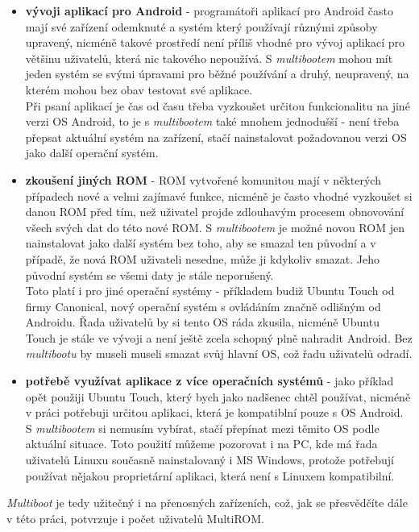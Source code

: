\documentclass[12pt, a4paper, oneside]{article}
\newcommand{\B}{\textbf} %
\newcommand{\It}{\textit}  %
\begin{document}
\begin{itemize}
    \item \B{vývoji aplikací pro Android} - programátoři aplikací pro Android často mají své zařízení odemknuté a systém který používají různými způsoby upravený, nicméně takové prostředí není příliš vhodné pro vývoj aplikací pro většinu uživatelů, která nic takového nepoužívá. S \It{multibootem} mohou mít jeden systém se svými úpravami pro běžné používání a druhý, neupravený, na kterém mohou bez obav testovat své aplikace. \\
    Při psaní aplikací je čas od času třeba vyzkoušet určitou funkcionalitu na jiné verzi OS Android, to je s \It{multibootem} také mnohem jednodušší - není třeba přepsat aktuální systém na zařízení, stačí nainstalovat požadovanou verzi OS jako další operační systém.

    \item \B{zkoušení jiných ROM} - ROM vytvořené komunitou mají v některých případech nové a velmi zajímavé funkce, nicméně je často vhodné vyzkoušet si danou ROM před tím, než uživatel projde zdlouhavým procesem obnovování všech svých dat do této nové ROM. S \It{multibootem} je možné novou ROM jen nainstalovat jako další systém bez toho, aby se smazal ten původní a v případě, že nová ROM uživateli nesedne, může ji kdykoliv smazat. Jeho původní systém se všemi daty je stále neporušený.\\
    Toto platí i pro jiné operační systémy - příkladem budiž Ubuntu Touch od firmy Canonical, nový operační systém s ovládáním značně odlišným od Androidu. Řada uživatelů by si tento OS ráda zkusila, nicméně Ubuntu Touch je stále ve vývoji a není ještě zcela schopný plně nahradit Android. Bez \It{multibootu} by museli museli smazat svůj hlavní OS, což řadu uživatelů odradí.

    \item \B{potřebě využívat aplikace z více operačních systémů} - jako příklad opět použiji Ubuntu Touch, který bych jako nadšenec chtěl používat, nicméně v práci potřebuji určitou aplikaci, která je kompatiblní pouze s OS Android. S \It{multibootem} si nemusím vybírat, stačí přepínat mezi těmito OS podle aktuální situace. Toto použití můžeme pozorovat i na PC, kde má řada uživatelů Linuxu současně nainstalovaný i MS Windows, protože potřebují používat nějakou proprietární aplikaci, která není s Linuxem kompatibilní.
\end{itemize}

\noindent \It{Multiboot} je tedy užitečný i na přenosných zařízeních, což, jak se přesvědčíte dále v této práci, potvrzuje i počet uživatelů MultiROM.
\end{document}
